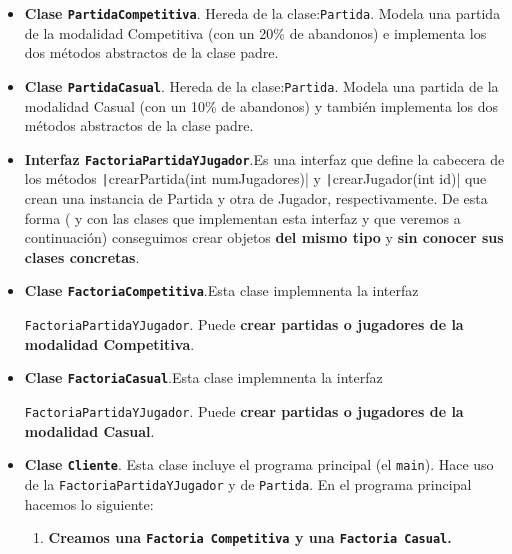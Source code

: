 \documentclass[a4paper,12pt]{article}
\begin{document}
\begin{itemize}
\begin{itemize}
					\item Define la cabecera de los dos métodos abstractos \texttt|getModalidadPartida()| y \texttt|getPorcentajeAbandono()| que deberán de implementar las clases hijas dependiendo de la modalidad de la partida.
				\end{itemize}
				
				\item \textbf{Clase \texttt{PartidaCompetitiva}}. Hereda de la clase:\texttt{Partida}. Modela una  partida de la modalidad Competitiva (con un 20\% de abandonos) e implementa los dos métodos abstractos de la clase padre.
				
				\item \textbf{Clase \texttt{PartidaCasual}}. Hereda de la clase:\texttt{Partida}. Modela una  partida de la modalidad Casual (con un 10\% de abandonos) y también implementa los dos métodos abstractos de la clase padre.
				
				\item \textbf{Interfaz \texttt{FactoriaPartidaYJugador}}.Es una interfaz que define la cabecera de los métodos \texttt|crearPartida(int numJugadores)| y \texttt|crearJugador(int id)| que crean una instancia de Partida y otra de Jugador, respectivamente. De esta forma ( y con las clases que implementan esta interfaz y que veremos a continuación) conseguimos crear objetos \textbf{del mismo tipo} y \textbf{sin conocer sus clases concretas}.
				
				\item \textbf{Clase \texttt{FactoriaCompetitiva}}.Esta clase implemnenta la interfaz 
				
				\texttt{FactoriaPartidaYJugador}. Puede \textbf{crear partidas o jugadores de la modalidad Competitiva}.
				
				\item \textbf{Clase \texttt{FactoriaCasual}}.Esta clase implemnenta la interfaz 
				
				\texttt{FactoriaPartidaYJugador}. Puede \textbf{crear partidas o jugadores de la modalidad Casual}.
				
				\item \textbf{Clase \texttt{Cliente}}. Esta clase incluye el programa principal (el \texttt{main}). Hace uso de la \texttt{FactoriaPartidaYJugador} y de \texttt{Partida}. En el programa principal hacemos lo siguiente:
				\begin{enumerate}
					\item \textbf{Creamos una \texttt{Factoria Competitiva} y una \texttt{Factoria Casual}.}
					

\end{enumerate}
\end{itemize}
\end{document}
